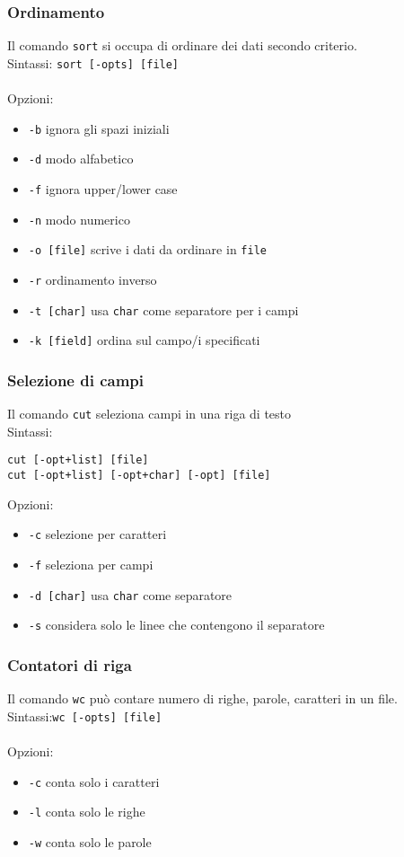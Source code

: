 \documentclass[a4paper, 10pt]{article}
\begin{document}
\subsubsection{Ordinamento} Il comando \verb|sort| si occupa di ordinare dei dati secondo criterio. \\
Sintassi: \verb|sort [-opts] [file]| \\ \\
Opzioni:
\begin{itemize}
\item \verb|-b| ignora gli spazi iniziali
\item \verb|-d| modo alfabetico
\item \verb|-f| ignora upper/lower case
\item \verb|-n| modo numerico
\item \verb|-o [file]| scrive i dati da ordinare in \verb|file|
\item \verb|-r| ordinamento inverso
\item \verb|-t [char]| usa \verb|char| come separatore per i campi
\item \verb|-k [field]| ordina sul campo/i specificati
\end{itemize}

\subsubsection{Selezione di campi} Il comando \verb|cut| seleziona campi in una riga di testo \\
Sintassi:
\begin{verbatim}
cut [-opt+list] [file]
cut [-opt+list] [-opt+char] [-opt] [file]
\end{verbatim}
Opzioni:
\begin{itemize}
\item \verb|-c| selezione per caratteri
\item \verb|-f| seleziona per campi
\item \verb|-d [char]| usa \verb|char| come separatore
\item \verb|-s| considera solo le linee che contengono il separatore
\end{itemize}
\subsubsection{Contatori di riga} Il comando \verb|wc| può contare numero di righe, parole, caratteri in un file. \\
Sintassi:\verb|wc [-opts] [file]| \\ \\
Opzioni:
\begin{itemize}
\item \verb|-c| conta solo i caratteri
\item \verb|-l| conta solo le righe
\item \verb|-w| conta solo le parole
\end{itemize}
\end{document}
